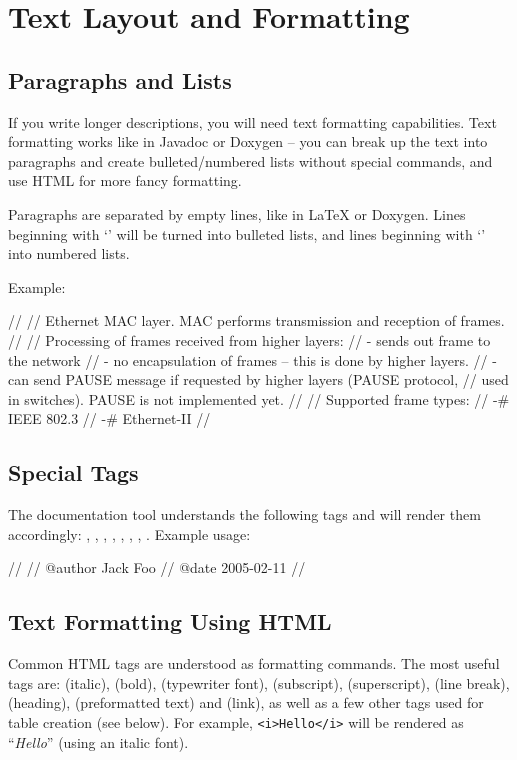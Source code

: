 \section{Text Layout and Formatting}

\subsection{Paragraphs and Lists}

If you write longer descriptions, you will need text formatting capabilities.
Text formatting works like in Javadoc or Doxygen -- you can break up the
text into paragraphs and create bulleted/numbered lists without
special commands, and use HTML for more fancy formatting.

Paragraphs are separated by empty lines, like in LaTeX or Doxygen.
Lines beginning with `\ttt{-}' will be turned into bulleted lists,
and lines beginning with `\ttt{-\#}' into numbered lists.

Example:

\begin{ned}
//
// Ethernet MAC layer. MAC performs transmission and reception of frames.
//
// Processing of frames received from higher layers:
// - sends out frame to the network
// - no encapsulation of frames -- this is done by higher layers.
// - can send PAUSE message if requested by higher layers (PAUSE protocol,
//   used in switches). PAUSE is not implemented yet.
//
// Supported frame types:
// -# IEEE 802.3
// -# Ethernet-II
//
\end{ned}


\subsection{Special Tags}

The documentation tool understands the following tags and will render them accordingly:
, , , , , ,
, . Example usage:

\begin{ned}
//
// @author Jack Foo
// @date 2005-02-11
//
\end{ned}


\subsection{Text Formatting Using HTML}

Common HTML tags are understood as formatting commands.
The most useful tags are:  (italic),
 (bold),  (typewriter font),
 (subscript),  (superscript),
 (line break),  (heading),
 (preformatted text) and  (link),
as well as a few other tags used for table creation (see below).
For example, \texttt{<i>Hello</i>} will be rendered as ``\textit{Hello}''
(using an italic font).

